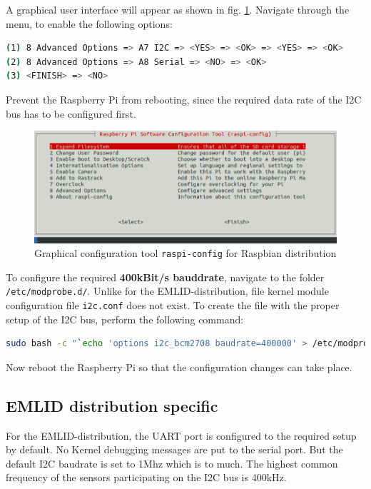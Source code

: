 A graphical user interface will appear as shown in fig. \ref{fig:OS:configProject:raspbian:raspiConfig}. Navigate through the menu, to enable the following options:
\begin{lstlisting}[language=bash,otherkeywords={make,scp,dd,sudo}]
(1) 8 Advanced Options => A7 I2C => <YES> => <OK> => <YES> => <OK>
(2) 8 Advanced Options => A8 Serial => <NO> => <OK>
(3) <FINISH> => <NO>
\end{lstlisting}

Prevent the Raspberry Pi from rebooting, since the required data rate of the I2C bus has to be configured first.
\begin{figure}[H]
    \centering
    \includegraphics[width=\textwidth]{fig/ch-rt-linux-os/raspiConfig}
    \caption{Graphical configuration tool \texttt{raspi-config} for Raspbian distribution}
    \label{fig:OS:configProject:raspbian:raspiConfig}
\end{figure}
To configure the required \textbf{400kBit/s bauddrate}, navigate to the folder \texttt{/etc/modprobe.d/}. Unlike for the EMLID-distribution, file kernel module configuration file \texttt{i2c.conf} does not exist. To create the file with the proper setup of the I2C bus, perform the following command:
\begin{lstlisting}[language=bash,otherkeywords={make,scp,sudo,nano}]
sudo bash -c "`echo 'options i2c_bcm2708 baudrate=400000' > /etc/modprobe.d/i2c.conf"
\end{lstlisting}

Now reboot the Raspberry Pi so that the configuration changes can take place.

\subsection{EMLID distribution specific}
\label{sec:OS:configProject:emlid}
For the EMLID-distribution, the UART port is configured to the required setup by default. No Kernel debugging messages are put to the serial port. But the default I2C baudrate is set to 1Mhz which is to much. The highest common frequency of the sensors participating on the I2C bus is 400kHz.

